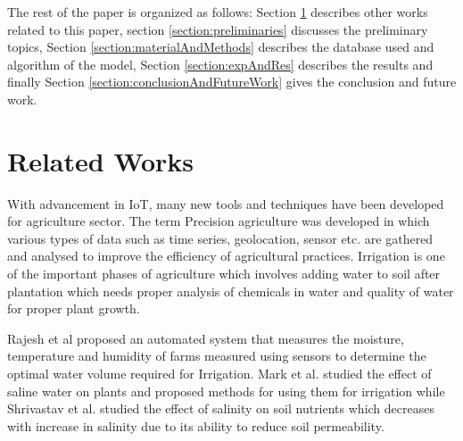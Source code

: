 \documentclass[conference]{IEEEtran}
\begin{document}
The rest of the paper is organized as follows: Section \ref{section:realtedWork} describes other works related to this paper, section \ref{section:preliminaries} discusses the preliminary topics, Section \ref{section:materialAndMethods} describes the database used and algorithm of the model, Section \ref{section:expAndRes} describes the results and finally Section \ref{section:conclusionAndFutureWork}  gives the conclusion and future work.

\section{Related Works}
\label{section:realtedWork}
With advancement in IoT, many new tools and techniques have been developed for agriculture sector. The term Precision agriculture\cite{article:precisionAgriculture} was developed in which various types of data such as time series, geolocation, sensor etc. are gathered and analysed to improve the efficiency of agricultural practices. Irrigation is one of the important phases of agriculture which involves adding water to soil after plantation which needs proper analysis of chemicals in water and quality of water for proper plant growth. 
 
Rajesh et al\cite{article:iotBasedIrrigationSystem} proposed an automated system that measures the moisture, temperature and humidity of farms measured using sensors to determine the optimal water volume required for Irrigation. Mark et al.\cite{article:water&soilwithconductivity} studied the effect of saline water on plants and proposed methods for using them for irrigation while Shrivastav et al.\cite{article:shrivastavSalinity} studied the effect of salinity on soil nutrients which decreases with increase in salinity due to its ability to reduce soil permeability. 
\end{document}

